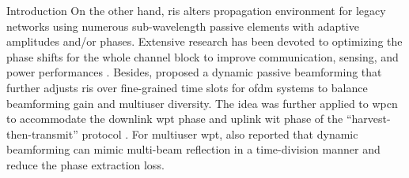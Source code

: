 \documentclass[journal]{IEEEtran}
\begin{document}
\begin{section}{Introduction}
	On the other hand, \gls{ris} alters propagation environment for legacy networks using numerous sub-wavelength passive elements with adaptive amplitudes and/or phases.
	Extensive research has been devoted to optimizing the phase shifts for the whole channel block to improve communication, sensing, and power performances \cite{Wu2018,Zhang2019a,Lin2022,Liu2022,Feng2022,Zhao2022}.
	Besides, \cite{Yang2020} proposed a dynamic passive beamforming that further adjusts \gls{ris} over fine-grained time slots for \gls{ofdm} systems to balance beamforming gain and multiuser diversity.
	The idea was further applied to \gls{wpcn} to accommodate the downlink \gls{wpt} phase and uplink \gls{wit} phase of the ``harvest-then-transmit'' protocol \cite{Wu2021d,Hua2022a}.
	For multiuser \gls{wpt}, \cite{Qiu2022} also reported that dynamic beamforming can mimic multi-beam reflection in a time-division manner and reduce the phase extraction loss.

\end{section}
\end{document}
